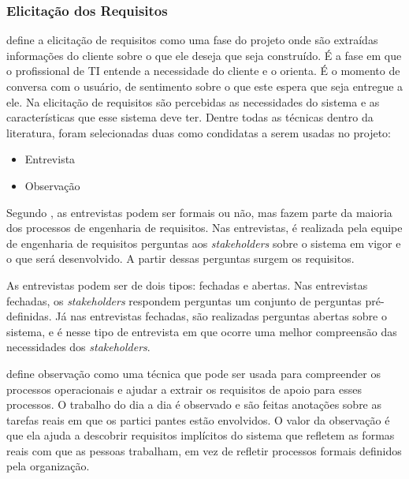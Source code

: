 \subsubsection{Elicitação dos Requisitos}
\label{sec:elicitacao_requisitos}

 define a elicitação de requisitos como uma fase do projeto onde são extraídas informações do cliente sobre o que ele deseja que seja construído. É a fase em que o profissional de TI entende a necessidade do cliente e o orienta. É o momento de conversa com o usuário, de sentimento sobre o que este espera que seja entregue a ele. Na elicitação de requisitos são percebidas as necessidades do sistema e as características que esse sistema deve ter. Dentre todas as técnicas dentro da literatura, foram selecionadas duas como condidatas a serem usadas no projeto:

\begin{itemize}
    \item Entrevista
    \item Observação
\end{itemize}

\label{sec:entrevista}

Segundo , as entrevistas podem ser formais ou não, mas fazem parte da maioria dos processos de engenharia de requisitos. Nas entrevistas, é realizada pela equipe de engenharia de requisitos perguntas aos \textit{stakeholders} sobre o sistema em vigor e o que será desenvolvido. A partir dessas perguntas surgem os requisitos.

As entrevistas podem ser de dois tipos: fechadas e abertas. Nas entrevistas fechadas, os \textit{stakeholders} respondem perguntas um conjunto de perguntas pré-definidas. Já nas entrevistas fechadas, são realizadas perguntas abertas sobre o sistema, e é nesse tipo de entrevista em que ocorre uma melhor compreensão das necessidades dos \textit{stakeholders}.  

\label{sec:observacao}

\cite{sommerville} define observação como uma técnica que pode ser usada para compreender os processos operacionais e ajudar a extrair os requisitos de apoio para esses processos. O trabalho do dia a dia é observado e são feitas anotações sobre as tarefas reais em que os partici­
pantes estão envolvidos. O valor da observação é que ela ajuda a descobrir requisitos implícitos do sistema que refletem as formas reais com que as pessoas trabalham, em vez de refletir processos formais definidos pela organização.

